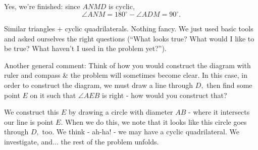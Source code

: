 








Yes, we're finished: since $ANMD$ is cyclic, $$\angle ANM = 180^\circ - \angle ADM = 90^\circ.$$

Similar triangles + cyclic quadrilaterals. Nothing fancy. We just used basic tools and asked ourselves the right questions (``What looks true?  What would I like to be true?  What haven't I used in the problem yet?'').

Another general comment: Think of how you would construct the diagram with ruler and compass \& the problem will sometimes become clear. In this case, in order to construct the diagram, we must draw a line through $D,$ then find some point $E$ on it such that $\angle AEB$ is right - how would you construct that?


We construct this $E$ by drawing a circle with diameter $AB$ - where it intersects our line is point $E.$ When we do this, we note that it looks like this circle goes through $D,$ too. We think - ah-ha! - we may have a cyclic quadrilateral. We investigate, and... the rest of the problem unfolds.

